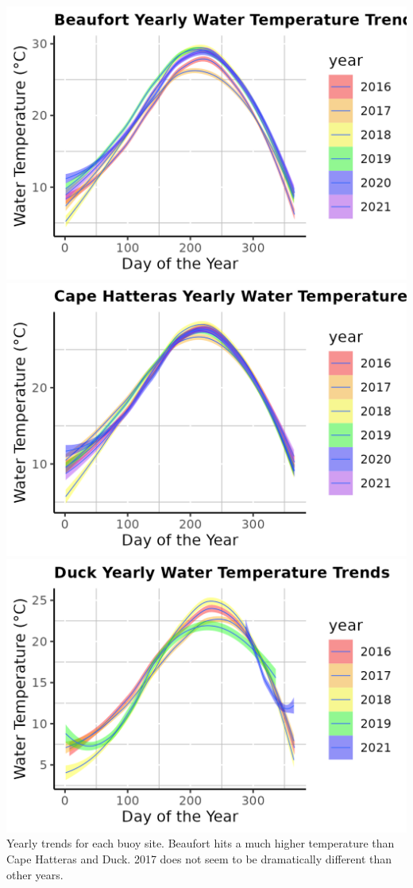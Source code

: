\documentclass[
]{article}
\begin{document}
\includegraphics{figures/beaufyearlytrend.png}
\includegraphics{figures/chyearlytrend.png}
\includegraphics{figures/duckyearlytrend.png} Yearly trends for each
buoy site. Beaufort hits a much higher temperature than Cape Hatteras
and Duck. 2017 does not seem to be dramatically different than other
years.
\end{document}
